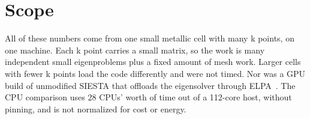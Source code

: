 \section*{Scope}

All of these numbers come from one small metallic cell with many k points, on one
machine. Each k point carries a small matrix, so the work is many independent small
eigenproblems plus a fixed amount of mesh work. Larger cells with fewer k points
load the code differently and were not timed. Nor was a GPU build of unmodified
SIESTA that offloads the eigensolver through ELPA~\citep{Marek2014}. The CPU comparison uses 28 CPUs'
worth of time out of a 112-core host, without pinning, and is not normalized for
cost or energy.
